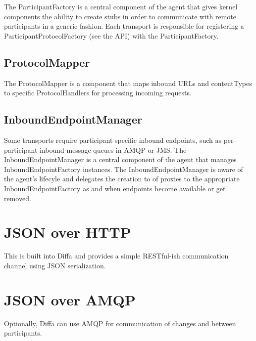 The ParticipantFactory is a central component of the agent that gives kernel components the ability to create stubs in order to communicate with remote participants in a generic fashion. Each transport is responsible for registering a ParticipantProtocolFactory (see the API) with the ParticipantFactory. 

\subsection{ProtocolMapper}

The ProtocolMapper is a component that maps inbound URLs and contentTypes to specific ProtocolHandlers for processing incoming requests.

\subsection{InboundEndpointManager}

Some transports require participant specific inbound endpoints, such as per-participant inbound message queues in AMQP or JMS. The InboundEndpointManager is a central component of the agent that manages InboundEndpointFactory instances. The InboundEndpointManager is aware of the agent's lifecyle and delegates the creation to of proxies to the appropriate InboundEndpointFactory as and when endpoints become available or get removed.

\section{JSON over HTTP}

This is built into Diffa and provides a simple RESTful-ish communication channel using JSON serialization.

\section{JSON over AMQP}

Optionally, Diffa can use AMQP for communication of changes and between participants.
